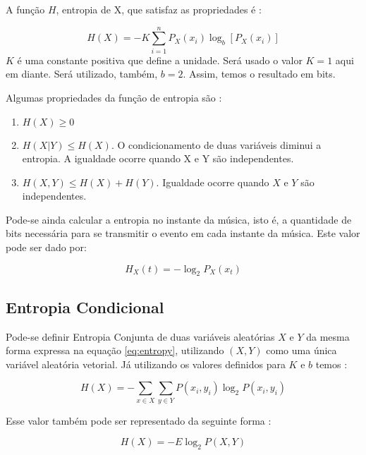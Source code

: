 A função $H$, entropia de X, que satisfaz as propriedades é \cite{shannon}:

\begin{equation}
    H(X) = - K \sum_{i=1}^{n} P_X(x_i) \log_b{[P_X(x_i)]}
\label{eq:entropy}
\end{equation}
$K$ é uma constante positiva que define a unidade. Será usado o valor $K=1$ aqui em diante. Será utilizado, também, $b=2$. Assim, temos o resultado em bits.

Algumas propriedades da função de entropia são \cite{livro}:

\begin{enumerate}
    \item $H(X) \geq 0$
    \item $H(X|Y) \leq H(X)$. O condicionamento de duas variáveis diminui a entropia. A igualdade ocorre quando X e Y são independentes.
    \item $H(X, Y) \leq H(X) + H(Y)$. Igualdade ocorre quando $X$ e $Y$ são independentes.
\end{enumerate}

Pode-se ainda calcular a entropia no instante da música, isto é, a quantidade de bits necessária para se transmitir o evento em cada instante da música. Este valor pode ser dado por:

\begin{equation}
    H_X(t) = - \log_2{P_X(x_t)} 
\end{equation}


\subsection{Entropia Condicional}

Pode-se definir Entropia Conjunta de duas variáveis aleatórias $X$ e $Y$ da mesma forma expressa na equação \ref{eq:entropy}, utilizando $(X, Y)$ como uma única variável aleatória vetorial. Já utilizando os valores definidos para $K$ e $b$ temos \cite{livro}:

\begin{equation}
    H(X) = - \sum_{x \in X}\sum_{y \in Y} P(x_i, y_i) \log_2{P(x_i, y_i)}
\label{eq:joint_entropy}
\end{equation}

Esse valor também pode ser representado da seguinte forma \cite{livro}:

\begin{equation}
    H(X) = - E \log_2{P(X, Y)}
\end{equation}

